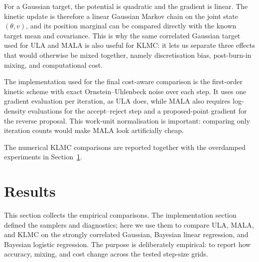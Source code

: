 \documentclass[a4paper,11pt, titlepage]{article}
\theoremstyle{definition}
\theoremstyle{plain}
\theoremstyle{remark}
\begin{document}
For a Gaussian target, the potential is quadratic and the gradient is
linear. The kinetic update is therefore a linear Gaussian Markov chain on
the joint state $(\theta,v)$, and its position marginal can be compared
directly with the known target mean and covariance. This is why the same
correlated Gaussian target used for ULA and MALA is also useful for KLMC:
it lets us separate three effects that would otherwise be mixed together,
namely discretisation bias, post-burn-in mixing, and computational cost.

The implementation used for the final cost-aware comparison is the
first-order kinetic scheme with exact Ornstein--Uhlenbeck noise over each
step. It uses one gradient evaluation per iteration, as ULA does, while
MALA also requires log-density evaluations for the accept--reject step
and a proposed-point gradient for the reverse proposal. This work-unit
normalisation is important: comparing only iteration counts would make
MALA look artificially cheap.

The numerical KLMC comparisons are reported together with the overdamped experiments in Section~\ref{sec:results}.

\section{Results}
\label{sec:results}

This section collects the empirical comparisons. The implementation section defined the samplers and diagnostics; here we use them to compare ULA, MALA, and KLMC on the strongly correlated Gaussian, Bayesian linear regression, and Bayesian logistic regression. The purpose is deliberately empirical: to report how accuracy, mixing, and cost change across the tested step-size grids.
\end{document}
